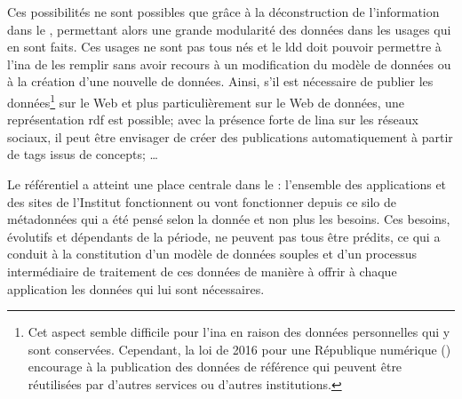 Ces possibilités ne sont possibles que grâce à la déconstruction de l'information dans le \ldd, permettant alors une grande modularité des données dans les usages qui en sont faits. Ces usages ne sont pas tous nés et le \ac{ldd} doit pouvoir permettre à l'\ac{ina} de les remplir sans avoir recours à un modification du modèle de données ou à la création d'une nouvelle de données. Ainsi, s'il est nécessaire de publier les données\footnote{Cet aspect semble difficile pour l'\ac{ina} en raison des données personnelles qui y sont conservées. Cependant, la loi de 2016 pour une République numérique (\cite{noauthor_loi_2016}) encourage à la publication des données de référence qui peuvent être réutilisées par d'autres services ou d'autres institutions.} sur le Web et plus particulièrement sur le Web de données, une représentation \ac{rdf} est possible; avec la présence forte de l\ac{ina} sur les réseaux sociaux, il peut être envisager de créer des publications automatiquement à partir de tags issus de concepts; \dots

\bigskip
\bigskip
Le référentiel a atteint une place centrale dans le \ldd: l'ensemble des applications et des sites de l'Institut fonctionnent ou vont fonctionner depuis ce silo de métadonnées qui a été pensé selon la donnée et non plus les besoins. Ces besoins, évolutifs et dépendants de la période, ne peuvent pas tous être prédits, ce qui a conduit à la constitution d'un modèle de données souples et d'un processus intermédiaire de traitement de ces données de manière à offrir à chaque application les données qui lui sont nécessaires.